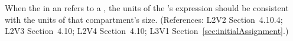 When the  in an \InitialAssignment refers to a
\Compartment, the units of the \InitialAssignment's  expression
should be consistent with the units of that compartment's size.  (References:
L2V2 Section~4.10.4; L2V3 Section~4.10; L2V4 Section~4.10; L3V1 
Section~\ref{sec:initialAssignment}.)
